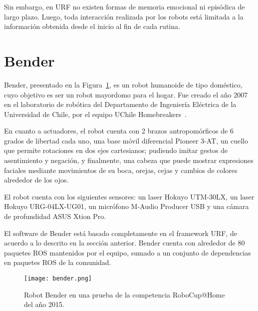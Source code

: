 Sin embargo, en URF no existen formas de memoria emocional ni episódica de largo plazo. Luego, toda interacción realizada por los robots está limitada a la información obtenida desde el inicio al fin de cada rutina.


\section{Bender}

Bender, presentado en la Figura~\ref{img:bender}, es un robot humanoide de tipo doméstico, cuyo objetivo es ser un robot mayordomo para el hogar. Fue creado el año 2007 en el laboratorio de robótica del Departamento de Ingeniería Eléctrica de la Universidad de Chile, por el equipo UChile Homebreakers~\cite{uchile-robotics}.

En cuanto a actuadores, el robot cuenta con 2 brazos antropomórficos de 6 grados de libertad cada uno, una base móvil diferencial Pioneer 3-AT, un cuello que permite rotaciones en dos ejes cartesianos; pudiendo imitar gestos de asentimiento y negación, y finalmente, una cabeza que puede mostrar expresiones faciales mediante movimientos de su boca, orejas, cejas y cambios de colores alrededor de los ojos.

El robot cuenta con los siguientes sensores: un laser Hokuyo UTM-30LX, un laser Hokuyo URG-04LX-UG01, un micrófono M-Audio Producer USB y una cámara de profundidad ASUS Xtion Pro.

El software de Bender está basado completamente en el framework URF, de acuerdo a lo descrito en la sección anterior. Bender cuenta con alrededor de 80 paquetes ROS mantenidos por el equipo, sumado a un conjunto de dependencias en paquetes ROS de la comunidad.

\begin{figure}[!ht]
	\centering
	\texttt{[image: bender.png]}
	\caption[Robot Bender en competencia RoboCup@Home, 2015.]
	{\small Robot Bender en una prueba de la competencia RoboCup@Home del año 2015.}
	\label{img:bender}
\end{figure}




